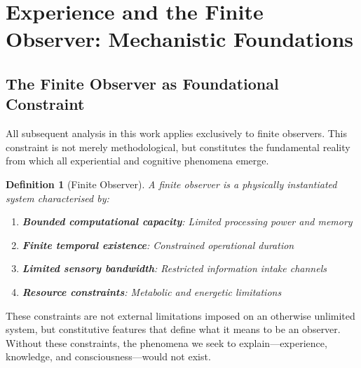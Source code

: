 \documentclass{article}
\newtheorem{definition}[theorem]{Definition}
\begin{document}
\begin{abstract}
This theoretical framework provides complete mechanistic coverage of experiential processes from physical foundations through termination endpoints while maintaining mathematical rigour and thermodynamic consistency, establishing experience as finite, meaningful, and naturally self-completing phenomena that achieve ultimate purpose through successful optimization completion.
\end{abstract}

\tableofcontents

\section{Experience and the Finite Observer: Mechanistic Foundations}

\subsection{The Finite Observer as Foundational Constraint}

All subsequent analysis in this work applies exclusively to finite observers. This constraint is not merely methodological, but constitutes the fundamental reality from which all experiential and cognitive phenomena emerge.

\begin{definition}[Finite Observer]
A finite observer is a physically instantiated system characterised by:
\begin{enumerate}
\item \textbf{Bounded computational capacity}: Limited processing power and memory
\item \textbf{Finite temporal existence}: Constrained operational duration
\item \textbf{Limited sensory bandwidth}: Restricted information intake channels
\item \textbf{Resource constraints}: Metabolic and energetic limitations
\end{enumerate}
\end{definition}

These constraints are not external limitations imposed on an otherwise unlimited system, but constitutive features that define what it means to be an observer. Without these constraints, the phenomena we seek to explain—experience, knowledge, and consciousness—would not exist.
\end{document}
